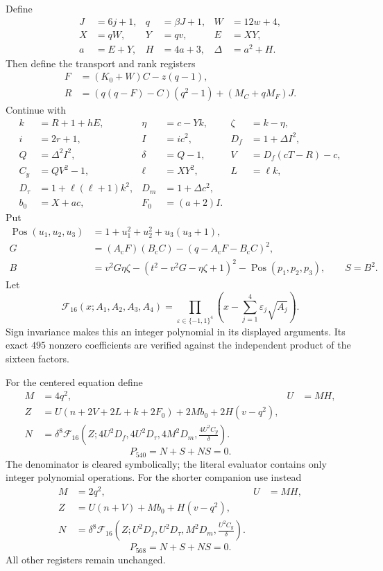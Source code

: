 Define
\begin{align*}
 J&=6j+1,&q&=\beta J+1,&W&=12w+4,\\
 X&=qW,&Y&=qv,&E&=XY,\\
 a&=E+Y,&H&=4a+3,&\Delta&=a^2+H.
\end{align*}
Then define the transport and rank registers
\begin{align*}
 F&=(K_0+W)C-z(q-1),\\
 R&=(q(q-F)-C)(q^2-1)+(M_C+qM_F)J.
\end{align*}
Continue with
\begin{align*}
 k&=R+1+hE,&\eta&=c-Yk,&\zeta&=k-\eta,\\
 i&=2r+1,&I&=ic^2,&D_f&=1+\Delta I^2,\\
 Q&=\Delta^2I^2,&\delta&=Q-1,&V&=D_f(cT-R)-c,\\
 C_y&=QV^2-1,&\ell&=XY^2,&L&=\ell k,\\
 D_\tau&=1+\ell(\ell+1)k^2,&D_m&=1+\Delta c^2,\\
 b_0&=X+ac,&F_0&=(a+2)I.
\end{align*}
Put
\begin{align*}
 \operatorname{Pos}(u_1,u_2,u_3)&=1+u_1^2+u_2^2+u_3(u_3+1),\\
 G&=(A_{\mathrm c}F)(B_{\mathrm c}C)
       -(q-A_{\mathrm c}F-B_{\mathrm c}C)^2,\\
 B&=v^2G\eta\zeta-(t^2-v^2G-\eta\zeta+1)^2
       -\operatorname{Pos}(p_1,p_2,p_3),\qquad S=B^2.
\end{align*}
Let
\[
 \mathcal F_{16}(x;A_1,A_2,A_3,A_4)
 =\prod_{\varepsilon\in\{-1,1\}^4}
       \left(x-\sum_{j=1}^4\varepsilon_j\sqrt{A_j}\right).
\]
Sign invariance makes this an integer polynomial in its displayed
arguments. Its exact $495$ nonzero coefficients are verified against the
independent product of the sixteen factors.

For the centered equation define
\begin{align*}
 M&=4q^2,&U&=MH,\\
 Z&=U(n+2V+2L+k+2F_0)+2Mb_0+2H(v-q^2),\\
 N&=\delta^8\mathcal F_{16}
   \left(Z;4U^2D_f,4U^2D_\tau,4M^2D_m,\frac{4U^2C_y}{\delta}\right).
\end{align*}
\[\boxed{P_{540}=N+S+NS=0.}\]
The denominator is cleared symbolically; the literal evaluator contains
only integer polynomial operations. For the shorter companion use instead
\begin{align*}
 M&=2q^2,&U&=MH,\\
 Z&=U(n+V)+Mb_0+H(v-q^2),\\
 N&=\delta^8\mathcal F_{16}
 \left(Z;U^2D_f,U^2D_\tau,M^2D_m,\frac{U^2C_y}{\delta}\right).
\end{align*}
\[\boxed{P_{568}=N+S+NS=0.}\]
All other registers remain unchanged.

